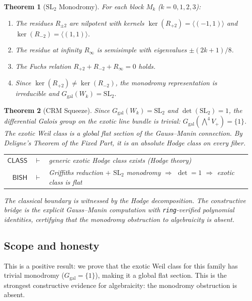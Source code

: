 \documentclass[11pt]{article}
\theoremstyle{plain}
\newtheorem{theorem}{Theorem}[section]
\theoremstyle{definition}
\theoremstyle{remark}
\newcommand{\SL}{\mathrm{SL}}
\newcommand{\Ggal}{G_{\mathrm{gal}}}
\newcommand{\BISH}{\ensuremath{\mathsf{BISH}}}
\newcommand{\CLASS}{\ensuremath{\mathsf{CLASS}}}
\begin{document}
\begin{theorem}[$\SL_2$ Monodromy]\label{thm:B}
For each block $M_k$ ($k = 0,1,2,3$):
\begin{enumerate}[nosep]
\item The residues $R_{\pm 2}$ are nilpotent with kernels
  $\ker(R_{+2}) = \langle(-1,1)\rangle$ and
  $\ker(R_{-2}) = \langle(1,1)\rangle$.
\item The residue at infinity $R_\infty$ is semisimple with eigenvalues
  $\pm(2k+1)/8$.
\item The Fuchs relation $R_{+2} + R_{-2} + R_\infty = 0$ holds.
\item Since $\ker(R_{+2}) \ne \ker(R_{-2})$, the monodromy representation
  is irreducible and $\Ggal(W_k) = \SL_2$.
\end{enumerate}
\end{theorem}

\begin{theorem}[CRM Squeeze]\label{thm:C}
Since $\Ggal(W_k) = \SL_2$ and $\det(\SL_2) = 1$, the differential
Galois group on the exotic line bundle is trivial:
$\Ggal(\bigwedge^4 V_+) = \{1\}$.
The exotic Weil class is a global flat section of the Gauss--Manin
connection. By Deligne's Theorem of the Fixed Part, it is an absolute
Hodge class on every fiber.
\begin{center}
\begin{tabular}{rcl}
$\CLASS$ & $\vdash$ & generic exotic Hodge class exists
  (Hodge theory) \\
$\BISH$ & $\vdash$ & Griffiths reduction $+$ $\SL_2$ monodromy
  $\Rightarrow$ $\det = 1$ $\Rightarrow$ exotic class is flat
\end{tabular}
\end{center}
The classical boundary is witnessed by the Hodge decomposition.
The constructive bridge is the explicit Gauss--Manin computation with
\texttt{ring}-verified polynomial identities, certifying that the
monodromy obstruction to algebraicity is absent.
\end{theorem}

\subsection{Scope and honesty}

This is a positive result: we prove that the exotic Weil class for this
family has trivial monodromy ($\Ggal = \{1\}$), making it a global flat
section. This is the strongest constructive evidence for algebraicity:
the monodromy obstruction is absent.
\end{document}
